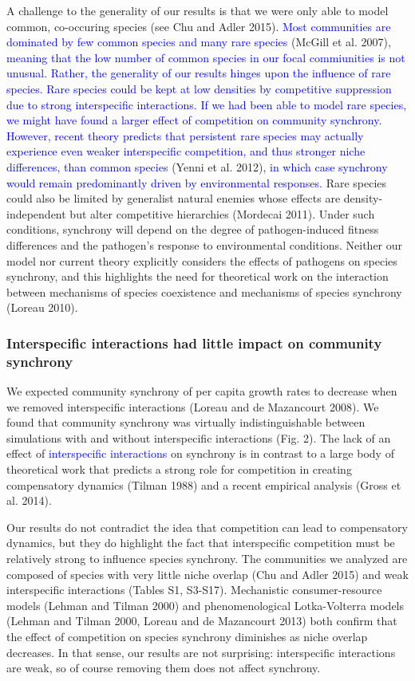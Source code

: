 \documentclass[12pt,]{article}
\begin{document}
A challenge to the generality of our results is that we were only able
to model common, co-occuring species (see Chu and Adler 2015).
\textcolor{blue}{Most communities are dominated by few common species and many rare species}
(McGill et al. 2007),
\textcolor{blue}{meaning that the low number of common species in our focal commiunities is not unusual.}
\textcolor{blue}{Rather, the generality of our results hinges upon the influence of rare species.
Rare species could be kept at low densities by competitive suppression due to strong interspecific interactions.
If we had been able to model rare species, we might have found a larger effect of competition on community synchrony.
However, recent theory predicts that persistent rare species may actually experience even weaker interspecific competition, and thus stronger niche differences, than common species}
(Yenni et al. 2012),
\textcolor{blue}{in which case synchrony would remain predominantly driven by environmental responses.}
Rare species could also be limited by generalist natural enemies whose
effects are density-independent but alter competitive hierarchies
(Mordecai 2011). Under such conditions, synchrony will depend on the
degree of pathogen-induced fitness differences and the pathogen's
response to environmental conditions. Neither our model nor current
theory explicitly considers the effects of pathogens on species
synchrony, and this highlights the need for theoretical work on the
interaction between mechanisms of species coexistence and mechanisms of
species synchrony (Loreau 2010).

\subsubsection{Interspecific interactions had little impact on community
synchrony}\label{interspecific-interactions-had-little-impact-on-community-synchrony}

We expected community synchrony of per capita growth rates to decrease
when we removed interspecific interactions (Loreau and {{de Mazancourt}}
2008). We found that community synchrony was virtually indistinguishable
between simulations with and without interspecific interactions (Fig.
2). The lack of an effect of
\textcolor{blue}{interspecific interactions} on synchrony is in contrast
to a large body of theoretical work that predicts a strong role for
competition in creating compensatory dynamics (Tilman 1988) and a recent
empirical analysis (Gross et al. 2014).

Our results do not contradict the idea that competition can lead to
compensatory dynamics, but they do highlight the fact that interspecific
competition must be relatively strong to influence species synchrony.
The communities we analyzed are composed of species with very little
niche overlap (Chu and Adler 2015) and weak interspecific interactions
(Tables S1, S3-S17). Mechanistic consumer-resource models (Lehman and
Tilman 2000) and phenomenological Lotka-Volterra models (Lehman and
Tilman 2000, Loreau and {{de Mazancourt}} 2013) both confirm that the
effect of competition on species synchrony diminishes as niche overlap
decreases. In that sense, our results are not surprising: interspecific
interactions are weak, so of course removing them does not affect
synchrony.
\end{document}
